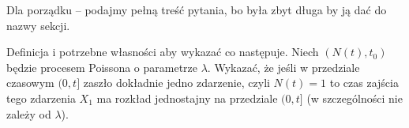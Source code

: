 Dla porządku -- podajmy pełną treść pytania, bo była zbyt długa by ją dać do nazwy sekcji.

\begin{question}
	Definicja i potrzebne własności aby wykazać co następuje. Niech \((N(t),t_0)\) będzie procesem Poissona o parametrze \(\lambda\). Wykazać, że jeśli w przedziale czasowym \((0,t]\) zaszło dokładnie jedno zdarzenie, czyli \(N(t) = 1\) to czas zajścia tego zdarzenia \(X_1\) ma rozkład jednostajny na przedziale \((0,t]\) (w szczególności nie zależy od \(\lambda\)).
\end{question}